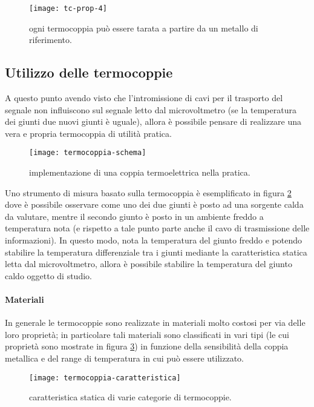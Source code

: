 		\begin{figure}[bht]
			\centering
			\texttt{[image: tc-prop-4]}
			\caption{ogni termocoppia può essere tarata a partire da un metallo di riferimento.}
			\label{fig:termocoppia:prop3}
		\end{figure}
		
	\subsection{Utilizzo delle termocoppie}
		A questo punto avendo visto che l'intromissione di cavi per il trasporto del segnale non influiscono sul segnale letto dal microvoltmetro (se la temperatura dei giunti due nuovi giunti è uguale), allora è possibile pensare di realizzare una vera e propria termocoppia di utilità pratica.
		
		\begin{figure}[bht]
			\centering
			\texttt{[image: termocoppia-schema]}
			\caption{implementazione di una coppia termoelettrica nella pratica.}
			\label{fig:termocoppia}
		\end{figure}
	
		Uno strumento di misura basato sulla termocoppia è esemplificato in figura \ref{fig:termocoppia} dove è possibile osservare come uno dei due giunti è posto ad una sorgente calda da valutare, mentre il secondo giunto è posto in un ambiente freddo a temperatura nota (e rispetto a tale punto parte anche il cavo di trasmissione delle informazioni). In questo modo, nota la temperatura del giunto freddo e potendo stabilire la temperatura differenziale tra i giunti mediante la caratteristica statica letta dal microvoltmetro, allora è possibile stabilire la temperatura del giunto caldo oggetto di studio.
		
		\paragraph{Materiali} In generale le termocoppie sono realizzate in materiali molto costosi per via delle loro proprietà; in particolare tali materiali sono classificati in vari tipi (le cui proprietà sono mostrate in figura \ref{fig:termocoppia:caratteristica}) in funzione della sensibilità della coppia metallica e del range di temperatura in cui può essere utilizzato. 	
		
		\begin{figure}[bht]
			\centering
			\texttt{[image: termocoppia-caratteristica]}
			\caption{caratteristica statica di varie categorie di termocoppie.}
			\label{fig:termocoppia:caratteristica}
		\end{figure}
			
